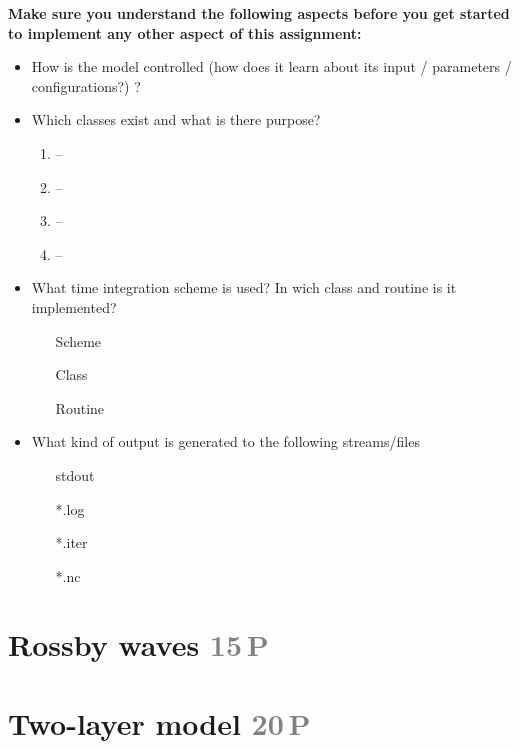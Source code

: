 \documentclass[jobname=project, 10pt]{article}
\newcommand{\task}[2]{\section{#1 \hfill \normalsize\normalfont \textcolor{gray}{#2\,P}}\addtocounter{ptot}{#2}}
\newcounter{ptot}
\begin{document}
\noindent\textbf{Make sure you understand the following aspects before you get started to implement any other aspect of this assignment:}
\begin{itemize}
\item How is the model controlled (how does it learn about its input / parameters / configurations?) ?
\item Which classes exist and what is there purpose?
  \begin{enumerate}
    \setlength{\itemsep}{1.5em}
  \item \underline{\phantom{CFQGCFQGCFQGCFQG}} -- \underline{\phantom{CFQGCFQGCFQGCFQG}}
  \item \underline{\phantom{CFQGCFQGCFQGCFQG}} -- \underline{\phantom{CFQGCFQGCFQGCFQG}}
  \item \underline{\phantom{CFQGCFQGCFQGCFQG}} -- \underline{\phantom{CFQGCFQGCFQGCFQG}}
  \item \underline{\phantom{CFQGCFQGCFQGCFQG}} -- \underline{\phantom{CFQGCFQGCFQGCFQG}}
  \end{enumerate}
\item What time integration scheme is used? In wich class and routine is it implemented? 
  \begin{itemize} 
    \setlength{\itemsep}{1.5em}
  \item[Scheme] \underline{\hspace{6cm}}
  \item[Class]  \underline{\hspace{6cm}}
  \item[Routine] \underline{\hspace{6cm}}
  \end{itemize}
    
  
\item What kind of output is generated to the following streams/files 
  \begin{itemize}
    \setlength{\itemsep}{1.5em}

  \item[stdout] \underline{\hspace{6cm}}
  \item[*.log] \underline{\hspace{6cm}} 
  \item[*.iter] \underline{\hspace{6cm}}
  \item[*.nc] \underline{\hspace{6cm}} 
  \end{itemize}
\end{itemize} 

\task{Rossby waves}{15}

\task{Two-layer model}{20} 
\end{document}
